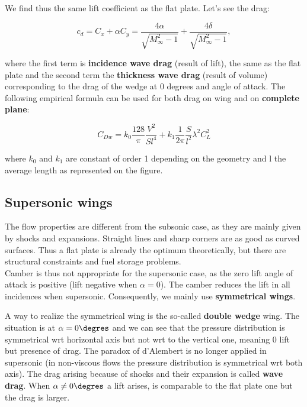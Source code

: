	We find thus the same lift coefficient as the flat plate. Let's see the drag: 
	
	\begin{equation}
	c_d = C_x + \alpha C_y = \frac{4\alpha }{\sqrt{M_\infty ^2 -1}} + \frac{4\delta}{\sqrt{M_\infty ^2 -1}},
	\end{equation}
	
	where the first term is \textbf{incidence wave drag} (result of lift), the same as the flat plate and the second term the \textbf{thickness wave drag} (result of volume) corresponding to the drag of the wedge at 0 degrees and angle of attack. The following empirical formula can be used for both drag on wing and on \textbf{complete plane}: 
	
	\begin{equation}
	C_{Dw} = k_0 \frac{128}{\pi} \frac{V^2}{Sl^4} + k_1 \frac{1}{2\pi} \frac{S}{l^2}\lambda ^2 C_L^2
	\end{equation}
	
	where $k_0$ and $k_1$ are constant of order 1 depending on the geometry and l the average length as represented on the figure. 
	
\subsection{Supersonic wings}
	The flow properties are different from the subsonic case, as they are mainly given by shocks and expansions. Straight lines and sharp corners are as good as curved surfaces. Thus a flat plate is already the optimum theoretically, but there are structural constraints and fuel storage problems. \\
	
	Camber is thus not appropriate for the supersonic case, as the zero lift angle of attack is positive (lift negative when $\alpha = 0$). The camber reduces the lift in all incidences when supersonic. Consequently, we mainly use \textbf{symmetrical wings}. 
	
	A way to realize the symmetrical wing is the so-called \textbf{double wedge} wing. The situation is at $\alpha = 0\degres$ and we can see that the pressure distribution is symmetrical wrt horizontal axis but not wrt to the vertical one, meaning 0 lift but presence of drag. The paradox of d'Alembert is no longer applied in supersonic (in non-viscous flows the pressure distribution is symmetrical wrt both axis). The drag arising because of shocks and their expansion is called \textbf{wave drag}. When $\alpha \neq 0\degres$ a lift arises, is comparable to the flat plate one but the drag is larger. 
	
